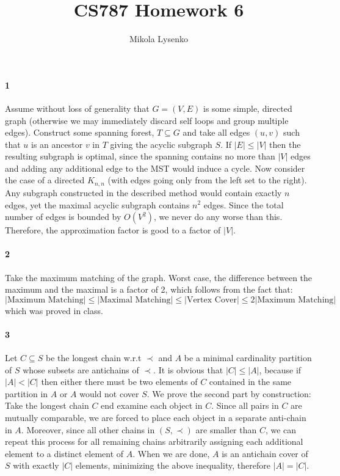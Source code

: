 \documentclass{article}
\title{CS787 Homework 6}
\author{Mikola Lysenko}
\begin{document}
\maketitle{}

\paragraph{1} Assume without loss of generality that $G = (V,E)$ is some simple, directed graph (otherwise we may immediately discard self loops and group multiple edges).  Construct some spanning forest, $T \subseteq G$ and take all edges $(u,v)$ such that $u$ is an ancestor $v$ in $T$ giving the acyclic subgraph $S$.  If $|E| \leq |V|$ then the resulting subgraph is optimal, since the spanning contains no more than $|V|$ edges and adding any additional edge to the MST would induce a cycle.  Now consider the case of a directed $K_{n,n}$ (with edges going only from the left set to the right).  Any subgraph constructed in the described method would contain exactly $n$ edges, yet the maximal acyclic subgraph contains $n^2$ edges.  Since the total number of edges is bounded by $O(V^2)$, we never do any worse than this.  Therefore, the approximation factor is good to a factor of $|V|$.

\paragraph{2} Take the maximum matching of the graph.  Worst case, the difference between the maximum and the maximal is a factor of 2, which follows from the fact that:
\[|\textrm{Maximum Matching}| \leq |\textrm{Maximal Matching}| \leq |\textrm{Vertex Cover}| \leq 2 |\textrm{Maximum Matching}|\]
which was proved in class.

\paragraph{3} Let $C \subseteq S$ be the longest chain w.r.t $\prec$ and $A$ be a minimal cardinality partition of $S$ whose subsets are antichains of $\prec$.  It is obvious that $|C| \leq |A|$, because if $|A| < |C|$ then either there must be two elements of $C$ contained in the same partition in $A$ or $A$ would not cover $S$.  We prove the second part by construction:  Take the longest chain $C$ end examine each object in $C$.  Since all pairs in $C$ are mutually comparable, we are forced to place each object in a separate anti-chain in $A$.  Moreover, since all other chains in $(S, \prec)$ are smaller than $C$, we can repeat this process for all remaining chains arbitrarily assigning each additional element to a distinct element of $A$.  When we are done, $A$ is an antichain cover of $S$ with exactly $|C|$ elements, minimizing the above inequality, therefore $|A| = |C|$.
\end{document}
